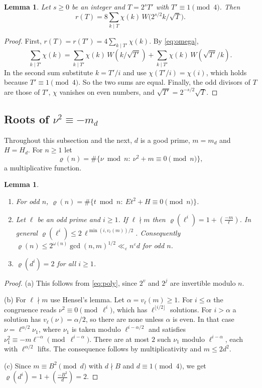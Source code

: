 \documentclass[11pt]{amsart}
\newtheorem{lemma}[theorem]{Lemma}
\theoremstyle{remark}
\theoremstyle{definition}
\numberwithin{equation}{section}
\newcommand{\eps}{\varepsilon}
\newcommand{\leg}[2]{\left(\frac{#1}{#2}\right)}
\begin{document}
\begin{lemma}\label{lem:hyperbola}
Let $s\ge0$ be an integer and $T=2^sT'$ with $T'\equiv1\pmod 4$. Then
\[
r(T)=8\sum_{k\mid T}\chi(k)\,W\bigl(2^{s/2}k/\sqrt T\bigr).
\]
\end{lemma}

\begin{proof}
First, $r(T)=r(T')=4\sum_{k\mid T'}\chi(k)$. By \eqref{eq:omega},
\[
\sum_{k\mid T'}\chi(k)=\sum_{k\mid T'}\chi(k)\,W(k/\sqrt{T'})+\sum_{k\mid T'}\chi(k)\,W(\sqrt{T'}/k).
\]
In the second sum substitute $k=T'/i$ and use $\chi(T'/i)=\chi(i)$, which holds because $T'\equiv1\pmod 4$. So the two sums are equal. Finally, the odd divisors of $T$ are those of $T'$, $\chi$ vanishes on even numbers, and $\sqrt{T'}=2^{-s/2}\sqrt T$.
\end{proof}

\subsection{\texorpdfstring{Roots of $\nu^2\equiv-m_d$}{Square roots of -m}}
Throughout this subsection and the next, $d$ is a good prime, $m=m_d$ and $H=H_d$. For $n\ge1$ let
\[
\varrho(n)=\#\{\nu\bmod n:\ \nu^2+m\equiv0\pmod n\},
\]
a multiplicative function.

\begin{lemma}\label{lem:rho}
\begin{enumerate}
\item[(a)] For odd $n$, $\varrho(n)=\#\{t\bmod n:\ Et^2+H\equiv0\pmod n\}$.
\item[(b)] Let $\ell$ be an odd prime and $i\ge1$. If $\ell\nmid m$ then $\varrho(\ell^i)=1+\leg{-m}{\ell}$. In general $\varrho(\ell^i)\le2\,\ell^{\min(i,v_\ell(m))/2}$. Consequently $\varrho(n)\le 2^{\omega(n)}\gcd(n,m)^{1/2}\ll_\eps n^{\eps}d$ for odd $n$.
\item[(c)] $\varrho(d^i)=2$ for all $i\ge1$.
\end{enumerate}
\end{lemma}

\begin{proof}
(a) This follows from \eqref{eq:poly}, since $2^v$ and $2^j$ are invertible modulo $n$.

(b) For $\ell\nmid m$ use Hensel's lemma. Let $\alpha=v_\ell(m)\ge1$. For $i\le\alpha$ the congruence reads $\nu^2\equiv0\pmod{\ell^i}$, which has $\ell^{\lfloor i/2\rfloor}$ solutions. For $i>\alpha$ a solution has $v_\ell(\nu)=\alpha/2$, so there are none unless $\alpha$ is even. In that case $\nu=\ell^{\alpha/2}\nu_1$, where $\nu_1$ is taken modulo $\ell^{i-\alpha/2}$ and satisfies $\nu_1^2\equiv-m\ell^{-\alpha}\pmod{\ell^{i-\alpha}}$. There are at most $2$ such $\nu_1$ modulo $\ell^{i-\alpha}$, each with $\ell^{\alpha/2}$ lifts. The consequence follows by multiplicativity and $m\le2d^2$.

(c) Since $m\equiv B^2\pmod d$ with $d\nmid B$ and $d\equiv1\pmod 4$, we get $\varrho(d^i)=1+\leg{-B^2}{d}=2$.
\end{proof}
\end{document}
